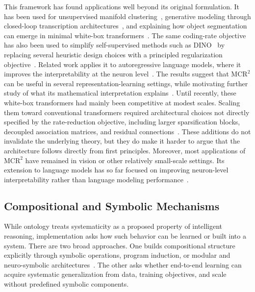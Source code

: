 \documentclass[acmsmall,screen,review,anonymous]{acmart}
\begin{document}
This framework has found applications well beyond its original formulation.
%
It has been used for unsupervised manifold clustering~\citep{tong2023unsupervised}, generative modeling through closed-loop transcription architectures~\citep{dai2023closedloop}, and explaining how object segmentation can emerge in minimal white-box transformers~\citep{yu2023emergence}. 
%
The same coding-rate objective has also been used to simplify self-supervised methods such as DINO~\citep{caron2021emerging} by replacing several heuristic design choices with a principled regularization objective~\citep{wu2025simplifying}.
%
Related work applies it to autoregressive language models, where it improves the interpretability at the neuron level~\citep{bai2025improving}. 
%
The results suggest that $\mathrm{MCR}^2$ can be useful in several representation-learning settings, while motivating further study of what its mathematical interpretation explains~\citep{buchanan2026principlespracticedeeprepresentation}.
%
Until recently, these white-box transformers had mainly been competitive at modest scales.
%
Scaling them toward conventional transformers required architectural choices not directly specified by the rate-reduction objective, including larger sparsification blocks, decoupled association matrices, and residual connections~\citep{yang2024scaling}.
%
These additions do not invalidate the underlying theory, but they do make it harder to argue that the architecture follows directly from first principles. 
%
Moreover, most applications of $\mathrm{MCR}^2$ have remained in vision or other relatively small-scale settings.
%
Its extension to language models has so far focused on improving neuron-level interpretability rather than language modeling performance~\citep{bai2025improving}.







\subsection{Compositional and Symbolic Mechanisms}
While ontology treats systematicity as a proposed property of intelligent reasoning, implementation asks how such behavior can be learned or built into a system.
%
There are two broad approaches.
%
One builds compositional structure explicitly through symbolic operations, program induction, or modular and neuro-symbolic architectures~\citep{marcus2020, lake2017, garcez2023nesy}.
%
The other asks whether end-to-end learning can acquire systematic generalization from data, training objectives, and scale without predefined symbolic components.
\end{document}
